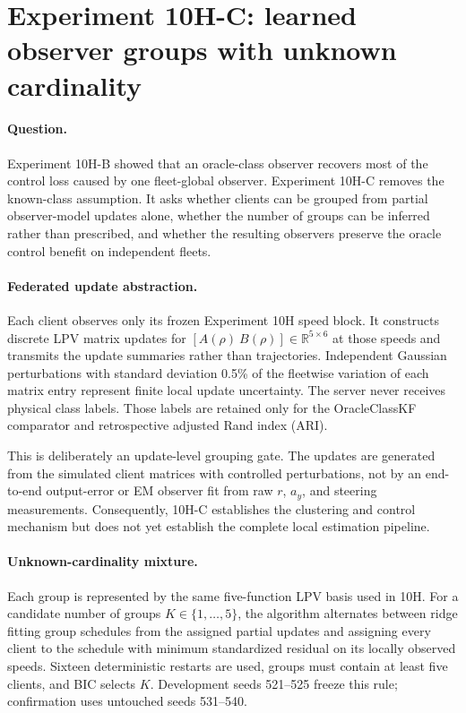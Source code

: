 \section{Experiment 10H-C: learned observer groups with unknown cardinality}
\label{sec:experiment10hc}

\paragraph{Question.}
Experiment 10H-B showed that an oracle-class observer recovers most of the
control loss caused by one fleet-global observer. Experiment 10H-C removes the
known-class assumption. It asks whether clients can be grouped from partial
observer-model updates alone, whether the number of groups can be inferred
rather than prescribed, and whether the resulting observers preserve the
oracle control benefit on independent fleets.

\paragraph{Federated update abstraction.}
Each client observes only its frozen Experiment 10H speed block. It constructs
discrete LPV matrix updates for
$[A(\rho)\ B(\rho)]\in\mathbb{R}^{5\times 6}$ at those speeds and transmits
the update summaries rather than trajectories. Independent Gaussian
perturbations with standard deviation 0.5\% of the fleetwise variation of each
matrix entry represent finite local update uncertainty. The server never
receives physical class labels. Those labels are retained only for the
OracleClassKF comparator and retrospective adjusted Rand index (ARI).

This is deliberately an update-level grouping gate. The updates are generated
from the simulated client matrices with controlled perturbations, not by an
end-to-end output-error or EM observer fit from raw $r$, $a_y$, and steering
measurements. Consequently, 10H-C establishes the clustering and control
mechanism but does not yet establish the complete local estimation pipeline.

\paragraph{Unknown-cardinality mixture.}
Each group is represented by the same five-function LPV basis used in 10H.
For a candidate number of groups $K\in\{1,\ldots,5\}$, the algorithm alternates
between ridge fitting group schedules from the assigned partial updates and
assigning every client to the schedule with minimum standardized residual on
its locally observed speeds. Sixteen deterministic restarts are used, groups
must contain at least five clients, and BIC selects $K$. Development seeds
521--525 freeze this rule; confirmation uses untouched seeds 531--540.

